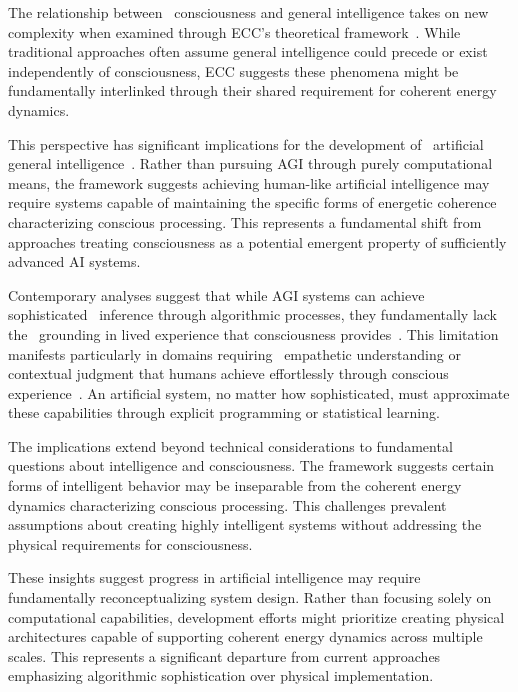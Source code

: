 The relationship between~ consciousness and general intelligence takes on new complexity when examined through ECC's theoretical framework~\cite{Tononi2015, McFadden2002}. While traditional approaches often assume general intelligence could precede or exist independently of consciousness, ECC suggests these phenomena might be fundamentally interlinked through their shared requirement for coherent energy dynamics.

This perspective has significant implications for the development of~ artificial general intelligence~\cite{Zarkadakis2016, Davies2018}. Rather than pursuing AGI through purely computational means, the framework suggests achieving human-like artificial intelligence may require systems capable of maintaining the specific forms of energetic coherence characterizing conscious processing. This represents a fundamental shift from approaches treating consciousness as a potential emergent property of sufficiently advanced AI systems.

Contemporary analyses suggest that while AGI systems can achieve sophisticated~ inference through algorithmic processes, they fundamentally lack the~ grounding in lived experience that consciousness provides~\cite{Dreyfus1992, Barandiaran2006}. This limitation manifests particularly in domains requiring~ empathetic understanding or~ contextual judgment that humans achieve effortlessly through conscious experience~\cite{Lake2017, Minsky2006}. An artificial system, no matter how sophisticated, must approximate these capabilities through explicit programming or statistical learning.

The implications extend beyond technical considerations to fundamental questions about intelligence and consciousness. The framework suggests certain forms of intelligent behavior may be inseparable from the coherent energy dynamics characterizing conscious processing. This challenges prevalent assumptions about creating highly intelligent systems without addressing the physical requirements for consciousness.

These insights suggest progress in artificial intelligence may require fundamentally reconceptualizing system design. Rather than focusing solely on computational capabilities, development efforts might prioritize creating physical architectures capable of supporting coherent energy dynamics across multiple scales. This represents a significant departure from current approaches emphasizing algorithmic sophistication over physical implementation.

